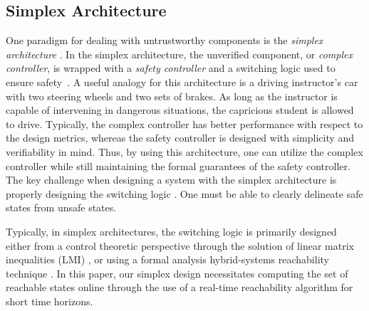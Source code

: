 \documentclass[manuscript,screen,review]{acmart}
\begin{document}
\subsection{Simplex Architecture}


One paradigm for dealing with untrustworthy components is the \emph{simplex architecture} \cite{RiveraAnArchitectural1996}. In the simplex architecture, the unverified component, or \emph{complex controller}, is wrapped with a \emph{safety controller} and a switching logic used to ensure safety~\cite{Bak2014}. A useful analogy for this architecture is a driving instructor's car with two steering wheels and two sets of brakes. As long as the instructor is capable of intervening in dangerous situations, the capricious student is allowed to drive. Typically, the complex controller has better performance with respect to the design metrics, whereas the safety controller is designed with simplicity and verifiability in mind. Thus, by using this architecture, one can utilize the complex controller while still maintaining the formal guarantees of the safety controller. The key challenge when designing a system with the simplex architecture is properly designing the switching logic \cite{Johnson2016}. One must be able to clearly delineate safe states from unsafe states. 

Typically, in simplex architectures, the switching logic is primarily designed either from a control theoretic perspective through the solution of linear matrix inequalities (LMI) \cite{SetoCaseStudy2000}, or using a formal analysis hybrid-systems reachability technique \cite{Bak2009Simplex}. In this paper, our simplex design necessitates computing the set of reachable states online through the use of a real-time reachability algorithm for short time horizons.
\end{document}
